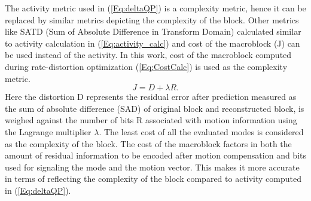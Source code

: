 \documentclass[11pt]{article} %
\begin{document}
The activity metric used in (\ref{Eq:deltaQP}) is a complexity metric, hence it can be replaced by similar metrics depicting the complexity of the block. Other metrics like SATD (Sum of Absolute Difference in Transform Domain) calculated similar to activity calculation in (\ref{Eq:activity_calc}) and cost of the macroblock (J) can be used instead of the activity. In this work, cost of the macroblock computed during rate-distortion optimization (\ref{Eq:CostCalc}) is used as the complexity metric. 
 \begin{equation}
	\label{Eq:CostCalc}
		J = D + \lambda R.
\end{equation}
Here the distortion D represents the residual error after prediction measured as the sum of absolute difference (SAD) of original block and reconstructed block, is weighed against the number of bits R associated with motion information using the Lagrange multiplier $\lambda$. The least cost of all the evaluated modes is considered as the complexity of the block. The cost of the macroblock factors in both the amount of residual information to be encoded after motion compensation and bits used for signaling the mode and the motion vector. This makes it more accurate in terms of reflecting the complexity of the block compared to activity computed in (\ref{Eq:deltaQP}).
\end{document}
